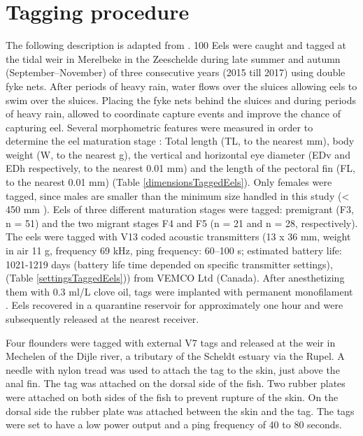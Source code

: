 \appendix

\section{Tagging procedure}
\label{Taggingprocedure}

\setcounter{table}{0} \renewcommand{\thetable}{A.\arabic{table}}
\setcounter{figure}{0} \renewcommand{\thefigure}{A.\arabic{figure}}

The following description is adapted from \citet{Verhelst2018}. 100 Eels were caught and tagged at the tidal weir in Merelbeke in the Zeeschelde during late summer and autumn (September–November) of three consecutive years (2015 till 2017) using double fyke nets. After periods of heavy rain, water flows over the sluices allowing eels to swim over the sluices. Placing the fyke nets behind the sluices and during periods of heavy rain, allowed to coordinate capture events and improve the chance of capturing eel. Several morphometric features were measured in order to determine the eel maturation stage \citep{Durif2005}: Total length (TL, to the nearest mm), body weight (W, to the nearest g), the vertical and horizontal eye diameter (EDv and EDh respectively, to the nearest 0.01 mm) and the length of the pectoral fin (FL, to the nearest 0.01 mm) (Table \ref{dimensionsTaggedEels}). Only females were tagged, since males are smaller than the minimum size handled in this study (< 450 mm \citep{Durif2005}). Eels of three different maturation stages were tagged: premigrant (F3, n = 51) and the two migrant stages F4 and F5 (n = 21 and n = 28, respectively). The eels were tagged with V13 coded acoustic transmitters (13 x 36 mm, weight in air 11 g, frequency 69 kHz, ping frequency: 60–100 s; estimated battery life: 1021-1219 days (battery life time depended on specific transmitter settings), (Table \ref{settingsTaggedEels})) from VEMCO Ltd (Canada). After anesthetizing them with 0.3 ml/L clove oil, tags were implanted with permanent monofilament \citep{Thorstad2013b}. Eels recovered in a quarantine reservoir for approximately one hour and were subsequently released at the nearest receiver. 

Four flounders were tagged with external V7 tags and released at the weir in Mechelen of the Dijle river, a tributary of the Scheldt estuary via the Rupel. A needle with nylon tread was used to attach the tag to the skin, just above the anal fin. The tag was attached on the dorsal side of the fish. Two rubber plates were attached on both sides of the fish to prevent rupture of the skin. On the dorsal side the rubber plate was attached between the skin and the tag. The tags were set to have a low power output and a ping frequency of 40 to 80 seconds.

